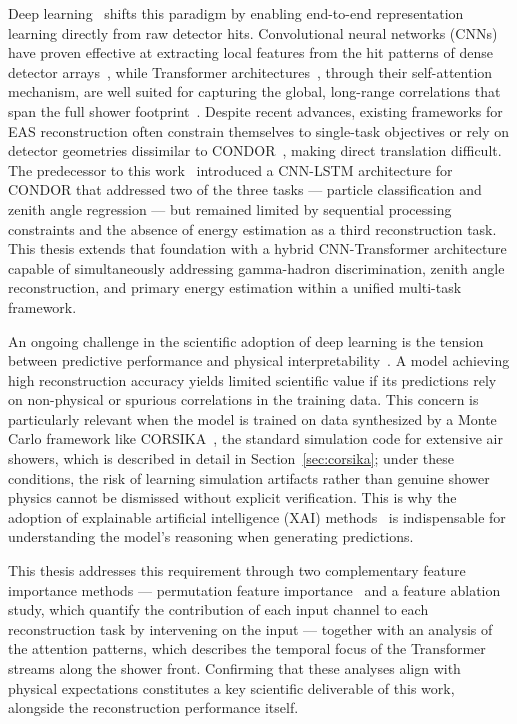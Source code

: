 Deep learning~ shifts this paradigm by enabling end-to-end representation learning directly from raw detector hits. Convolutional neural networks (CNNs)~ have proven effective at extracting local features from the hit patterns of dense detector arrays~, while Transformer architectures~, through their self-attention mechanism, are well suited for capturing the global, long-range correlations that span the full shower footprint~. Despite recent advances, existing frameworks for EAS reconstruction often constrain themselves to single-task objectives or rely on detector geometries dissimilar to CONDOR~, making direct translation difficult. The predecessor to this work~ introduced a CNN-LSTM architecture for CONDOR that addressed two of the three tasks --- particle classification and zenith angle regression --- but remained limited by sequential processing constraints and the absence of energy estimation as a third reconstruction task. This thesis extends that foundation with a hybrid CNN-Transformer architecture capable of simultaneously addressing gamma-hadron discrimination, zenith angle reconstruction, and primary energy estimation within a unified multi-task framework.

An ongoing challenge in the scientific adoption of deep learning is the tension between predictive performance and physical interpretability~. A model achieving high reconstruction accuracy yields limited scientific value if its predictions rely on non-physical or spurious correlations in the training data. This concern is particularly relevant when the model is trained on data synthesized by a Monte Carlo framework like CORSIKA~, the standard simulation code for extensive air showers, which is described in detail in Section~\ref{sec:corsika}; under these conditions, the risk of learning simulation artifacts rather than genuine shower physics cannot be dismissed without explicit verification. This is why the adoption of explainable artificial intelligence (XAI) methods~ is indispensable for understanding the model’s reasoning when generating predictions.

This thesis addresses this requirement through two complementary feature importance methods --- permutation feature importance~ and a feature ablation study, which quantify the contribution of each input channel to each reconstruction task by intervening on the input --- together with an analysis of the attention patterns, which describes the temporal focus of the Transformer streams along the shower front. Confirming that these analyses align with physical expectations constitutes a key scientific deliverable of this work, alongside the reconstruction performance itself.

